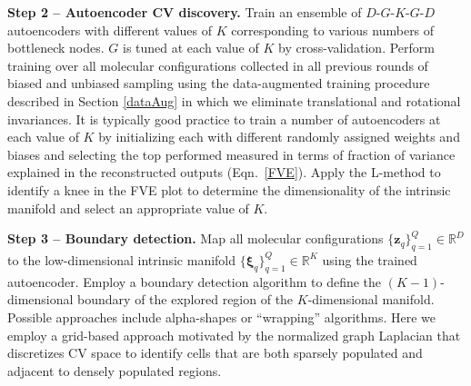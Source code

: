 \documentclass[12pt]{article}
\newcommand*{\blauw}[1]{#1}
\begin{document}
\textbf{Step 2 -- Autoencoder CV discovery.} Train an ensemble of $D$-$G$-$K$-$G$-$D$ autoencoders with different values of $K$ corresponding to various numbers of bottleneck nodes. $G$ is tuned at each value of $K$ by cross-validation. Perform training over all molecular configurations collected in all previous rounds of biased and unbiased sampling using the data-augmented training procedure described in \blauw{Section \ref{dataAug}} in which we eliminate translational and rotational invariances. It is typically good practice to train a number of autoencoders at each value of $K$ by initializing each with different randomly assigned weights and biases and selecting the top performed measured in terms of fraction of variance explained in the reconstructed outputs (\blauw{Eqn.~\ref{FVE}}). Apply the L-method\cite{salvador2004determining} to identify a knee in the FVE plot to determine the dimensionality of the intrinsic manifold and select an appropriate value of $K$.

\textbf{Step 3 -- Boundary detection.} Map all molecular configurations $\{\mathbf{z}_q\}_{q=1}^Q \in \mathbb{R}^D$ to the low-dimensional intrinsic manifold $\{\boldsymbol\xi_q\}_{q=1}^Q \in \mathbb{R}^K$ using the trained autoencoder. Employ a boundary detection algorithm to define the $(K-1)$-dimensional boundary of the explored region of the $K$-dimensional manifold. Possible approaches include alpha-shapes \cite{chiavazzo2017intrinsic,edelsbrunner1983shape,edelsbrunner1994three} or ``wrapping'' algorithms\cite{edelsbrunner2003surface}. Here we employ a grid-based approach motivated by the normalized graph Laplacian that discretizes CV space to identify cells that are both sparsely populated and adjacent to densely populated regions.
\end{document}
